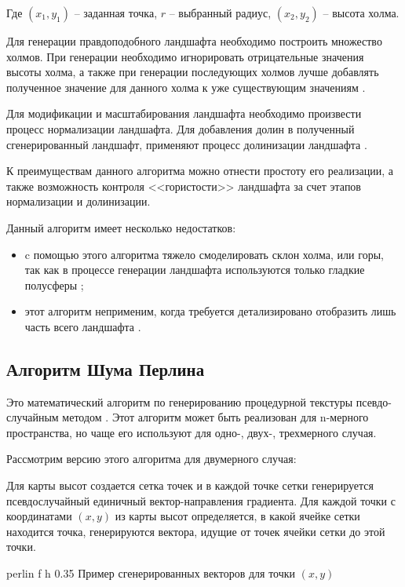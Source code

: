 Где $(x_1, y_1)$ -- заданная точка, $r$ -- выбранный радиус, $(x_2, y_2)$ -- высота холма.

Для генерации правдоподобного ландшафта необходимо построить множество холмов. При генерации необходимо игнорировать отрицательные значения высоты холма, а также при генерации последующих холмов лучше добавлять полученное значение для данного холма к уже существующим значениям \cite{datalands}. 

Для модификации и масштабирования ландшафта необходимо произвести процесс нормализации ландшафта. Для добавления долин в полученный сгенерированный ландшафт, применяют процесс долинизации ландшафта \cite{hillalg}.

К преимуществам данного алгоритма можно отнести простоту его реализации, а также возможность контроля <<гористости>> ландшафта за счет этапов нормализации и долинизации.

Данный алгоритм имеет несколько недостатков:

\begin{itemize}[label=--]
	\item c помощью этого алгоритма тяжело смоделировать склон холма, или
	горы, так как в процессе генерации ландшафта используются только
	гладкие полусферы \cite{hillalgflaws};
	\item этот алгоритм неприменим, когда требуется детализировано
	отобразить лишь часть всего ландшафта \cite{hillalgflaws}.
\end{itemize}

\subsection{Алгоритм Шума Перлина}

Это математический алгоритм по генерированию процедурной
текстуры псевдо-случайным методом \cite{perlnoise}. Этот алгоритм может быть реализован для n-мерного пространства, но чаще его используют для одно-, двух-, трехмерного случая.

Рассмотрим версию этого алгоритма для двумерного случая:

Для карты высот создается сетка точек и в каждой точке сетки генерируется псевдослучайный единичный вектор-направления градиента. Для каждой точки с координатами $(x, y)$ из карты высот определяется, в какой ячейке сетки находится точка, генерируются вектора, идущие от точек ячейки сетки до этой точки.

{perlin} %
{f} %
{h} %
{0.35\textwidth} %
{Пример сгенерированных векторов для точки $(x, y)$} %


